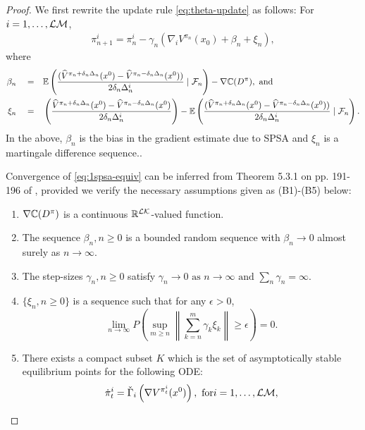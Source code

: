 \begin{proof}

We first rewrite the update rule \eqref{eq:theta-update} as follows: For $i=1,\ldots,\mathcal{L}\mathcal{M}$,
\begin{align}
\pi^{i}_{n+1}  =  \pi^{i}_n -  \gamma_n(\nabla_{i} V^{\pi_n}(x_0) + \beta_n + \xi_n), 
\label{eq:1spsa-equiv}
\end{align}
where 
\begin{align*}
\beta_n \quad= &\quad \mathbb{E}\left(\dfrac{(\widehat V^{\pi_n + \delta_n \Delta_n}(x^0) -\widehat V^{\pi_n - \delta_n \Delta_n}(x^0))}{2 \delta_n \Delta_n^{i}} \mid \mathcal{F}_n \right) - \nabla \mathbb{C}(D^\pi), \text{ and}\\
\xi_n \quad = & \quad\left(\dfrac{\widehat V^{\pi_n + \delta_n \Delta_n}(x^0) -\widehat V^{\pi_n - \delta_n \Delta_n}(x^0)}{2 \delta_n\Delta_n^{i}}\right)  - \mathbb{E}\left(\dfrac{(\widehat V^{\pi_n + \delta_n \Delta_n}(x^0) -\widehat V^{\pi_n - \delta_n \Delta_n}(x^0))}{2 \delta_n \Delta_n^{i}}\mid \mathcal{F}_n \right).
\end{align*}
In the above, $\beta_n$ is the bias in the gradient estimate due to SPSA and $\xi_n$ is a martingale difference sequence..

Convergence of \eqref{eq:1spsa-equiv} can be inferred from Theorem 5.3.1 on pp. 191-196 of \cite{kushner-clark}, provided we verify the necessary assumptions given as (B1)-(B5) below:
\begin{enumerate}[\bfseries (B1)]
\item $\nabla \mathbb{C}(D^\pi)$ is a continuous $\mathbb{R}^{\mathcal{L}\mathcal{K}}$-valued function.
\item  The sequence $\beta_n,n\geq 0$ is a bounded random sequence with
$\beta_n \rightarrow 0$ almost surely as $n\rightarrow \infty$.
\item The step-sizes $\gamma_n,n\geq 0$ satisfy
$  \gamma_n\rightarrow 0 \mbox{ as }n\rightarrow\infty \text{ and } \sum_n \gamma_n=\infty.$
\item $\{\xi_n, n\ge 0\}$ is a sequence such that for any $\epsilon>0$,
\[ \lim_{n\rightarrow\infty} P\left( \sup_{m\geq n}  \left\|
\sum_{k=n}^{m} \gamma_k \xi_k\right\| \geq \epsilon \right) = 0. \]
\item There exists a compact subset $K$ which is the set of asymptotically stable equilibrium points for the following ODE:
\begin{align}
\dot\pi^{i}_t = \check\Gamma_{i}\left( \nabla V^{\pi^{i}_t}(x^0)\right), \text{ for} i=1,\dots,\mathcal{L}\mathcal{M},\label{eq:pi-ode}
\end{align}
\end{enumerate} 


\end{proof}
